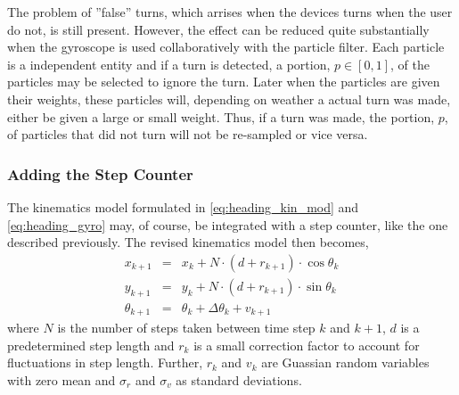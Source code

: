\documentclass{LTHthesis}
\begin{document}
The problem of ''false'' turns, which arrises when the devices turns when the user do not, is still present. However, the effect can be reduced quite substantially when the gyroscope is used collaboratively with the particle filter. Each particle is a independent entity and if a turn is detected, a portion, $p\in[0,1]$, of the particles may be selected to ignore the turn. Later when the particles are given their weights, these particles will, depending on weather a actual turn was made, either be given a large or small weight. Thus, if a turn was made, the portion, $p$, of particles that did not turn will not be re-sampled or vice versa. 

\subsubsection{Adding the Step Counter}
%
The kinematics model formulated in \ref{eq:heading_kin_mod} and \ref{eq:heading_gyro} may, of course, be integrated with a step counter, like the one described previously. The revised kinematics model then becomes,
%
\begin{eqnarray}
x_{k+1} &  = & x_k + N\cdot (d + r_{k+1})\cdot\cos{\theta_k} \nonumber\\
y_{k+1} & = &y_k + N\cdot (d + r_{k+1})\cdot\sin{\theta_k}\label{eq:heading_step_kin_mod}\\
\theta_{k+1} & = & \theta_k +\Delta\theta_k+ v_{k+1} \nonumber
\end{eqnarray}  
%
where $N$ is the number of steps taken between time step $k$ and $k+1$, $d$ is a predetermined step length and $ r_k$ is a small correction factor to account for fluctuations in step length. Further, $r_k$ and $v_k$ are Guassian random variables with zero mean and $\sigma_r$ and  $\sigma_v$ as standard deviations.
\end{document}
